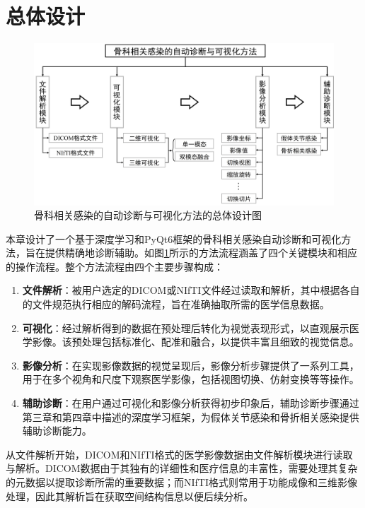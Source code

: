 \section{总体设计}

\begin{figure}[h]
  \centering
  \includegraphics[width=\textwidth]{figures/chap05_overall.jpg}
  \caption{骨科相关感染的自动诊断与可视化方法的总体设计图}
  \label{fig:chap05_overall}
\end{figure}

本章设计了一个基于深度学习和PyQt6框架的骨科相关感染自动诊断和可视化方法，旨在提供精确地诊断辅助。如图\ref{fig:chap05_overall}所示的方法流程涵盖了四个关键模块和相应的操作流程。整个方法流程由四个主要步骤构成：
\begin{enumerate}
  \item \textbf{文件解析}：被用户选定的DICOM或NIfTI文件经过读取和解析，其中根据各自的文件规范执行相应的解码流程，旨在准确抽取所需的医学信息数据。
  \item \textbf{可视化}：经过解析得到的数据在预处理后转化为视觉表现形式，以直观展示医学影像。该预处理包括标准化、配准和融合，以提供丰富且细致的视觉信息。
  \item \textbf{影像分析}：在实现影像数据的视觉呈现后，影像分析步骤提供了一系列工具，用于在多个视角和尺度下观察医学影像，包括视图切换、仿射变换等等操作。
  \item \textbf{辅助诊断}：在用户通过可视化和影像分析获得初步印象后，辅助诊断步骤通过第三章和第四章中描述的深度学习框架，为假体关节感染和骨折相关感染提供辅助诊断能力。
\end{enumerate}

从文件解析开始，DICOM和NIfTI格式的医学影像数据由文件解析模块进行读取与解析。DICOM数据由于其独有的详细性和医疗信息的丰富性，需要处理其复杂的元数据以提取诊断所需的重要数据；而NIfTI格式则常用于功能成像和三维影像处理，因此其解析旨在获取空间结构信息以便后续分析。

